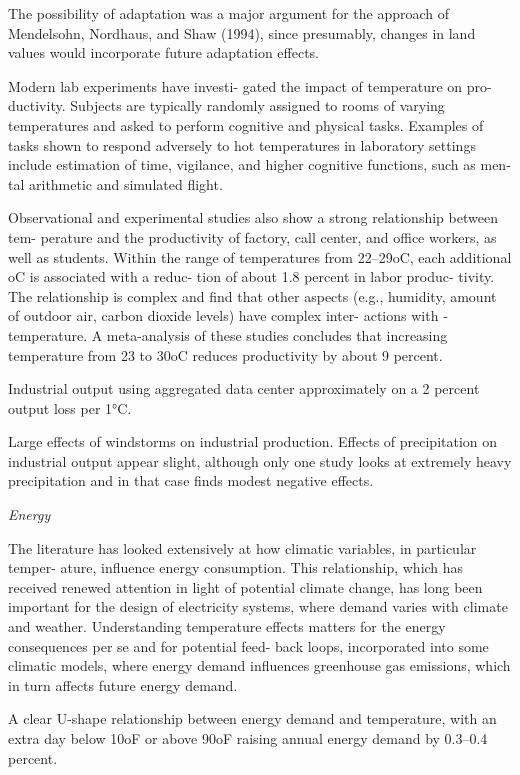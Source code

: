 \documentclass[
]{book}
\begin{document}
The possibility of adaptation was a major argument for
the approach of Mendelsohn, Nordhaus,
and Shaw (1994), since presumably, changes
in land values would incorporate future
adaptation effects.

Modern lab experiments have investi-
gated the impact of temperature on pro-
ductivity. Subjects are typically randomly
assigned to rooms of varying temperatures
and asked to perform cognitive and physical
tasks. Examples of tasks shown to respond
adversely to hot temperatures in laboratory
settings include estimation of time, vigilance,
and higher cognitive functions, such as men-
tal arithmetic and simulated flight.

Observational and experimental studies
also show a strong relationship between tem-
perature and the productivity of factory, call
center, and office workers, as well as students.
Within
the range of temperatures from 22--29oC,
each additional oC is associated with a reduc-
tion of about 1.8 percent in labor produc-
tivity.
The
relationship is complex and find that other
aspects (e.g., humidity, amount of outdoor
air, carbon dioxide levels) have complex inter-
actions with ­temperature.
A meta-analysis of these
studies concludes that increasing temperature
from 23 to 30oC reduces productivity by about
9 percent.

Industrial output using aggregated data
center approximately on a 2 percent output
loss per 1°C.

Large effects of windstorms on industrial production.
Effects of precipitation on
industrial output appear slight, although only
one study looks at extremely heavy precipitation
and in that case finds modest negative
effects.

\emph{Energy}

The literature has looked extensively at
how climatic variables, in particular temper-
ature, influence energy consumption. This
relationship, which has received renewed
attention in light of potential climate change,
has long been important for the design of
electricity systems, where demand varies
with climate and weather. Understanding
temperature effects matters for the energy
consequences per se and for potential feed-
back loops, incorporated into some climatic
models, where
energy demand influences greenhouse
gas ­emissions, which in turn affects future
energy demand.

A clear U-shape
relationship between energy demand and
temperature, with an extra day below 10oF
or above 90oF raising annual energy demand
by 0.3--0.4 percent.
\end{document}
